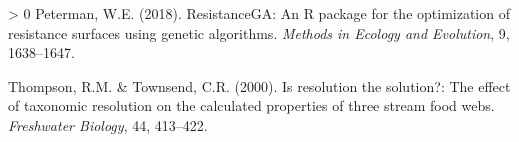 \documentclass[11pt]{article}
\newlength{\cslhangindent}
\newenvironment{CSLReferences}[3] %
 {%
  \setlength{\parindent}{0pt}
  \ifodd #1 \everypar{\setlength{\hangindent}{\cslhangindent}}\ignorespaces\fi
  \ifnum #2 > 0
  \setlength{\parskip}{#2\baselineskip}
  \fi
 }%
 {}
\begin{document}
\begin{CSLReferences}{1}{0}
\leavevmode\hypertarget{ref-Peterman2018ResRP}{}%
Peterman, W.E. (2018). ResistanceGA: An R package for the optimization
of resistance surfaces using genetic algorithms. \emph{Methods in
Ecology and Evolution}, 9, 1638--1647.

\leavevmode\hypertarget{ref-Thompson2000ResSol}{}%
Thompson, R.M. \& Townsend, C.R. (2000). Is resolution the solution?:
The effect of taxonomic resolution on the calculated properties of three
stream food webs. \emph{Freshwater Biology}, 44, 413--422.

\end{CSLReferences}
\end{document}
